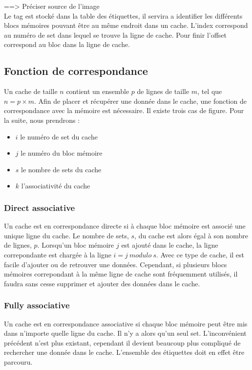 ==> Préciser source de l'image\\

Le tag est stocké dans la table des étiquettes, il servira a identifier les différents blocs mémoires pouvant être au même endroit dans un cache. L'index correspond au numéro de set dans lequel se trouve la ligne de cache. Pour finir l'offset correspond au bloc dans la ligne de cache.

\subsection{Fonction de correspondance}
Un cache de taille $n$ contient un ensemble $p$ de lignes de taille $m$, tel que $n = p \times m$. Afin de placer et récupérer une donnée dans le cache, une fonction de correspondance avec la mémoire est nécessaire. Il existe trois cas de figure. Pour la suite, nous prendrons : \\
\begin{itemize}
\item $i$ le numéro de set du cache
\item $j$ le numéro du bloc mémoire
\item $s$ le nombre de sets du cache
\item $k$ l'associativité du cache 
\end{itemize}

\subsubsection{Direct associative}
Un cache est en correspondance directe si à chaque bloc mémoire est associé une unique ligne du cache. Le nombre de sets, $s$, du cache est alors égal à son nombre de lignes, $p$. Lorsqu'un bloc mémoire $j$ est ajouté dans le cache, la ligne correpondante est chargée à la ligne $i = j\ modulo\ s$. Avec ce type de cache, il est facile d'ajouter ou de retrouver une données. Cependant, si plusieurs blocs mémoires correpondant à la même ligne de cache sont fréquemment utilisés, il faudra sans cesse supprimer et ajouter des données dans le cache.

\subsubsection{Fully associative}
Un cache est en correspondance associative si chaque bloc mémoire peut être mis dans n'importe quelle ligne du cache. Il n'y a alors qu'un seul set. L'inconvénient précédent n'est plus existant, cependant il devient beaucoup plus compliqué de rechercher une donnée dans le cache. L'ensemble des étiquettes doit en effet être parcouru.

